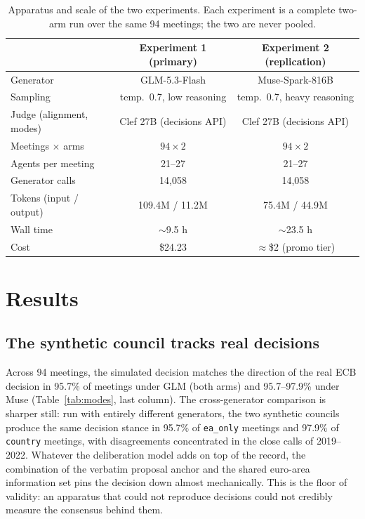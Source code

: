 \documentclass[11pt,a4paper]{article}
\begin{document}
\begin{table}[t]
\centering
\small
\caption{Apparatus and scale of the two experiments. Each experiment is a complete two-arm run over the same 94 meetings; the two are never pooled.}
\label{tab:apparatus}
\begin{tabular}{lcc}
\toprule
 & Experiment 1 (primary) & Experiment 2 (replication) \\
\midrule
Generator & GLM-5.3-Flash & Muse-Spark-816B \\
Sampling & temp.\ 0.7, low reasoning & temp.\ 0.7, heavy reasoning \\
Judge (alignment, modes) & Clef 27B (decisions API) & Clef 27B (decisions API) \\
Meetings $\times$ arms & $94 \times 2$ & $94 \times 2$ \\
Agents per meeting & 21--27 & 21--27 \\
Generator calls & 14,058 & 14,058 \\
Tokens (input / output) & 109.4M / 11.2M & 75.4M / 44.9M \\
Wall time & $\sim$9.5 h & $\sim$23.5 h \\
Cost & \$24.23 & $\approx$\$2 (promo tier) \\
\bottomrule
\end{tabular}
\end{table}

\section{Results}\label{sec:results}

\subsection{The synthetic council tracks real decisions}\label{sec:validity}

Across 94 meetings, the simulated decision matches the direction of the real ECB decision in 95.7\% of meetings under GLM (both arms) and 95.7--97.9\% under Muse (Table~\ref{tab:modes}, last column). The cross-generator comparison is sharper still: run with entirely different generators, the two synthetic councils produce the same decision stance in 95.7\% of \texttt{ea\_only} meetings and 97.9\% of \texttt{country} meetings, with disagreements concentrated in the close calls of 2019--2022. Whatever the deliberation model adds on top of the record, the combination of the verbatim proposal anchor and the shared euro-area information set pins the decision down almost mechanically. This is the floor of validity: an apparatus that could not reproduce decisions could not credibly measure the consensus behind them.
\end{document}
